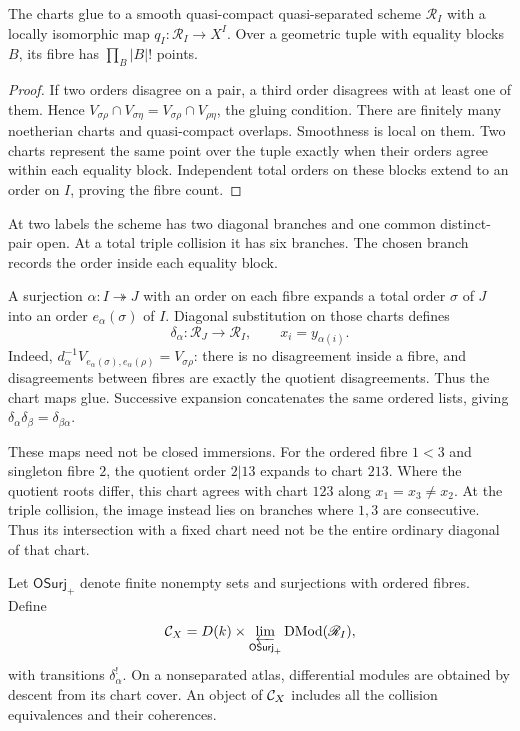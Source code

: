 \begin{proposition}\label{cycuts:prop:atlas}
The charts glue to a smooth quasi-compact quasi-separated scheme
$\mathscr R_I$ with a locally isomorphic map $q_I:\mathscr R_I\to X^I$.
Over a geometric tuple with equality blocks $B$, its fibre has
$\prod_B|B|!$ points.
\end{proposition}
\begin{proof}
If two orders disagree on a pair, a third order disagrees with at
least one of them. Hence
$V_{\sigma\rho}\cap V_{\sigma\eta}
 =V_{\sigma\rho}\cap V_{\rho\eta}$, the gluing condition.
There are finitely many noetherian charts and quasi-compact overlaps.
Smoothness is local on them. Two charts represent the same point
over the tuple exactly when their orders agree within each equality
block. Independent total orders on these blocks extend to an order
on $I$, proving the fibre count.
\end{proof}

At two labels the scheme has two diagonal branches and one common
distinct-pair open. At a total triple collision it has six branches.
The chosen branch records the order inside each equality block.

A surjection $\alpha:I\twoheadrightarrow J$ with an order on each
fibre expands a total order $\sigma$ of $J$ into an order
$e_\alpha(\sigma)$ of $I$. Diagonal substitution on those charts
defines
\begin{equation}\label{cycuts:eq:atlas-collision}
 \delta_\alpha:\mathscr R_J\longrightarrow\mathscr R_I,
 \qquad x_i=y_{\alpha(i)}.
\end{equation}
Indeed,
$d_\alpha^{-1}V_{e_\alpha(\sigma),e_\alpha(\rho)}
 =V_{\sigma\rho}$: there is no disagreement inside a fibre, and
disagreements between fibres are exactly the quotient disagreements.
Thus the chart maps glue. Successive expansion concatenates the same
ordered lists, giving
$\delta_\alpha\delta_\beta=\delta_{\beta\alpha}$.

These maps need not be closed immersions. For the ordered fibre
$1<3$ and singleton fibre $2$, the quotient order $2|13$ expands
to chart $213$. Where the quotient roots differ, this chart agrees
with chart $123$ along $x_1=x_3\ne x_2$. At the triple collision,
the image instead lies on branches where $1,3$ are consecutive.
Thus its intersection with a fixed chart need not be the entire
ordinary diagonal of that chart.

Let $\mathsf{OSurj}_+$ denote finite nonempty sets and surjections
with ordered fibres. Define
\begin{equation}\label{cycuts:eq:atlas-category}
 \mathcal C_X=D(k)\times
 \varprojlim_{\mathsf{OSurj}_+}\operatorname{DMod}(\mathscr R_I),
\end{equation}
with transitions $\delta_\alpha^!$. On a nonseparated atlas,
differential modules are obtained by descent from its chart cover.
An object of $\mathcal C_X$ includes all the collision equivalences and
their coherences.

